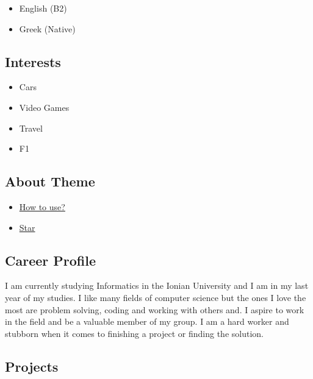 \documentclass[english,]{article}
\providecommand{\tightlist}{%
  \setlength{\itemsep}{0pt}\setlength{\parskip}{0pt}}
\begin{document}
\begin{itemize}
\tightlist
\item
  English {(B2)}
\item
  Greek {(Native)}
\end{itemize}

\hypertarget{interests}{%
\subsection{Interests}\label{interests}}

\begin{itemize}
\tightlist
\item
  Cars
\item
  Video Games
\item
  Travel
\item
  F1
\end{itemize}

\hypertarget{about-theme}{%
\subsection{About Theme}\label{about-theme}}

\begin{itemize}
\tightlist
\item
  \href{https://www.youtube.com/watch?v=Jnmj1dXDbNk}{How to use?}
\item
  \href{https://github.com/sharu725/online-cv}{Star}
\end{itemize}

\hypertarget{career-profile}{%
\subsection{\texorpdfstring{{ \emph{} \emph{} } Career
Profile}{    Career Profile}}\label{career-profile}}

I am currently studying Informatics in the Ionian University and I am in
my last year of my studies. I like many fields of computer science but
the ones I love the most are problem solving, coding and working with
others and. I aspire to work in the field and be a valuable member of my
group. I am a hard worker and stubborn when it comes to finishing a
project or finding the solution.

\hypertarget{projects}{%
\subsection{\texorpdfstring{{ \emph{} \emph{} }
Projects}{    Projects}}\label{projects}}
\end{document}
